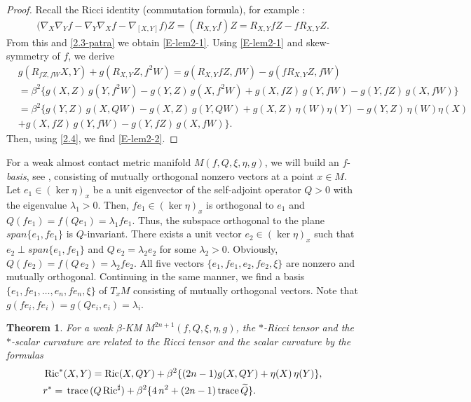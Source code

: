 \documentclass[11pt,a4paper,twoside]{article}
\newtheorem{theorem}{Theorem}%
\def\Ric{\operatorname{Ric}}
\def\tr{{\rm\,trace\,}}
\begin{document}
{\begin{proof} Recall the Ricci identity (commutation formula),
for example \cite{CLN-2006}:
\begin{align*}
 \big(\nabla_X\nabla_Y f - \nabla_Y\nabla_X f
 -\nabla_{[X,Y]} f\big)Z =
 (R_{X,Y}f)Z = R_{X,Y} fZ - f R_{X,Y} Z.
\end{align*}
From this and \eqref{2.3-patra} we obtain \eqref{E-lem2-1}.
Using \eqref{E-lem2-1} and skew-symmetry of $f$, we derive
\begin{align*}
& g(R_{fZ, fW}X, Y) + g( R_{X,Y}Z, f^2W)
 = g(R_{X,Y}fZ, fW) - g(f R_{X,Y}Z, fW) \\
& = \beta^2\{ g(X,Z)\,g(Y, f^2W) - g(Y,Z)\,g(X, f^2W)
 + g(X,fZ)\,g(Y, fW) - g(Y,fZ)\,g(X, fW) \} \\
& = \beta^2\{ g(Y,Z)\,g(X, QW) -g(X,Z)\,g(Y, QW) +g(X,Z)\,\eta(W)\eta(Y) -g(Y,Z)\,\eta(W)\eta(X) \\
& + g(X,fZ)\,g(Y, fW) - g(Y,fZ)\,g(X, fW) \}.
\end{align*}
Then, using \eqref{2.4}, we find \eqref{E-lem2-2}.
\end{proof}

For a weak almost contact metric manifold $M(f,Q,\xi,\eta,g)$,
we will build an $f$-\textit{basis}, see \cite{rov-128},
consis\-ting of mutually orthogonal nonzero vectors at a point $x\in M$.
Let $e_1\in(\ker\eta)_x$ be a unit eigenvector of the self-adjoint operator $Q>0$ with the eigenvalue $\lambda_1>0$.
Then, $fe_1\in(\ker\eta)_x$ is orthogonal to $e_1$ and $Q(fe_1) = f(Qe_1) = \lambda_1 fe_1$.
Thus, the subspace orthogonal to the plane $span\{e_1,fe_1\}$ is $Q$-invariant.
 There exists a unit vector $e_2\in(\ker\eta)_x$ such that $e_2\perp span\{e_1, fe_1\}$
and $Q\,e_2= \lambda_2 e_2$  for some $\lambda_2>0$.
Obviously, $Q(fe_2) = f(Q\,e_2) = \lambda_2 fe_2$.
All five vectors $\{e_1, fe_1,e_2, fe_2, \xi\}$ are nonzero and mutually orthogonal.
Continuing in the same manner, we find a basis $\{e_1, fe_1,\ldots, e_n, fe_n, \xi\}$ of $T_x M$
consisting of mutually orthogonal vectors.
Note that $g(fe_i,fe_i)=g(Qe_i,e_i)=\lambda_i$.

\begin{theorem}\label{T-1-ast}
For a weak $\beta$-KM $M^{2n+1}(f,Q,\xi,\eta,g)$, the $\ast$-{Ricci tensor} and the $\ast$-{scalar curvature}
are related to the Ricci tensor and the scalar curvature by the formulas
\begin{align}\label{E-ast-Ric}
  & \Ric^\ast(X,Y) = \Ric(X,QY) + \beta^2\{(2n-1) g(X,QY) + \eta(X)\,\eta(Y)\},\\
\label{E-ast-scal}
  & {r}^\ast = \tr(Q\Ric^\sharp)
  + \beta^2\{4\,n^2 + (2n-1)\tr\widetilde Q\} .
\end{align}
\end{theorem}

}
\end{document}
